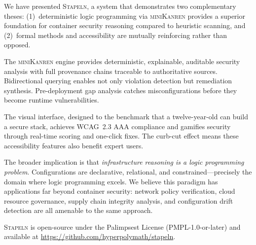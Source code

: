 \documentclass[11pt,twocolumn]{article}
\newcommand{\stapeln}{\textsc{Stapeln}\xspace}
\newcommand{\minikanren}{\textsc{miniKanren}\xspace}
\begin{document}
We have presented \stapeln, a system that demonstrates two
complementary theses: (1)~deterministic logic programming via
\minikanren provides a superior foundation for container security
reasoning compared to heuristic scanning, and (2)~formal methods and
accessibility are mutually reinforcing rather than opposed.

The \minikanren engine provides deterministic, explainable,
auditable security analysis with full provenance chains traceable to
authoritative sources. Bidirectional querying enables not only
violation detection but remediation synthesis. Pre-deployment gap
analysis catches misconfigurations before they become runtime
vulnerabilities.

The visual interface, designed to the benchmark that a twelve-year-old
can build a secure stack, achieves WCAG~2.3 AAA compliance and
gamifies security through real-time scoring and one-click fixes. The
curb-cut effect means these accessibility features also benefit
expert users.

The broader implication is that \emph{infrastructure reasoning is a
logic programming problem}. Configurations are declarative, relational,
and constrained---precisely the domain where logic programming
excels. We believe this paradigm has applications far beyond container
security: network policy verification, cloud resource governance,
supply chain integrity analysis, and configuration drift detection
are all amenable to the same approach.

\stapeln is open-source under the Palimpsest License
(PMPL-1.0-or-later) and available at
\url{https://github.com/hyperpolymath/stapeln}.


\end{document}
